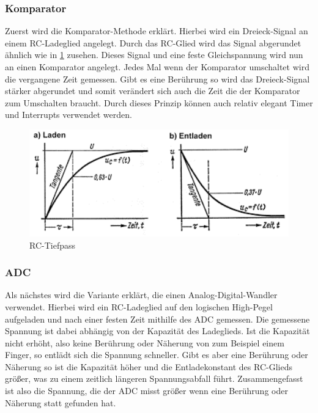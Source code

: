 \documentclass[a4paper,
DIV=13,
12pt,
BCOR=10mm,
department=FakEI,
parskip=half,
automark,
]{article}
\begin{document}
\subsubsection{Komparator}
Zuerst wird die Komparator-Methode erklärt. Hierbei wird ein Dreieck-Signal an einem RC-Ladeglied angelegt. Durch das RC-Glied wird das Signal abgerundet ähnlich wie in \ref{fig:Tiefpass} zusehen. Dieses Signal und eine feste Gleichspannung wird nun an einen Komparator angelegt. Jedes Mal wenn der Komparator umschaltet wird die vergangene Zeit gemessen. Gibt es eine Berührung so wird das Dreieck-Signal stärker abgerundet und somit verändert sich auch die Zeit die der Komparator zum Umschalten braucht. Durch dieses Prinzip können auch relativ elegant Timer und Interrupts verwendet werden. 
\begin{figure}[!hbpt]
 \begin{center} \includegraphics[width=1\textwidth]{RCTiefpass.png}
 \caption{RC-Tiefpass}
 \label{fig:Tiefpass}
  \end{center}
\end{figure}

\subsubsection{ADC}
Als nächstes wird die Variante erklärt, die einen Analog-Digital-Wandler verwendet. Hierbei wird ein RC-Ladeglied auf den logischen High-Pegel aufgeladen und nach einer festen Zeit mithilfe des ADC gemessen. Die gemessene Spannung ist dabei abhängig von der Kapazität des Ladeglieds. Ist die Kapazität nicht erhöht, also keine Berührung oder Näherung von zum Beispiel einem Finger, so entlädt sich die Spannung schneller. Gibt es aber eine Berührung oder Näherung so ist die Kapazität höher und die Entladekonstant des RC-Glieds größer, was zu einem zeitlich längeren Spannungsabfall führt. Zusammengefasst ist also die Spannung, die der ADC misst größer wenn eine Berührung oder Näherung statt gefunden hat. 
\end{document}

